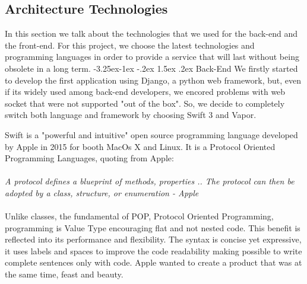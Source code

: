 \documentclass[]{usiinfbachelorproject}
\makeatletter
\newcommand\subsubsection{\@startsection{subsubsection}{3}{\z@}%
                {-3.25ex\@plus -1ex \@minus -.2ex}%
                {1.5ex \@plus .2ex}%
                {\normalfont\normalsize\bfseries}}
\makeatother
\begin{document}
\begin{figure}[H]
  \centering

\end{figure} 
\subsection{Architecture Technologies}
In this section we talk about the technologies that we used for the back-end and the front-end. For this project, we choose the latest technologies and programming languages in order to provide a service that will last without being obsolete in a long term.
\subsubsection{Back-End}
We firstly started to develop the first application using Django, a python web framework, but, even if its widely used among back-end developers, we encored problems with web socket that were not supported "out of the box".
So, we decide to completely switch both language and framework by choosing Swift 3 and Vapor.

Swift is a "powerful and intuitive" open source programming language developed by Apple in 2015 for booth MacOs X and Linux. It is a Protocol Oriented Programming Languages, quoting from Apple:
\\
\\
\emph{A protocol defines a blueprint of methods, properties .. The protocol can then be adopted by a class, structure, or enumeration - Apple}
\\
\\
Unlike classes, the fundamental of POP, Protocol Oriented Programming, programming is Value Type encouraging flat and not nested code. This benefit is reflected into its performance and flexibility.
The syntax is concise yet expressive, it uses labels and spaces to improve the code readability making possible to write complete sentences only with code. Apple wanted to create a product that was at the same time, feast and beauty.
\end{document}
